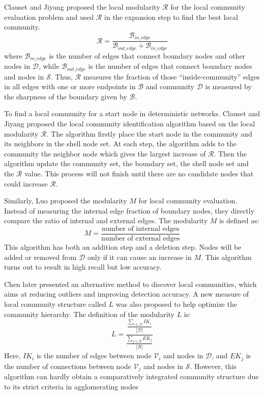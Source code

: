 \documentclass[\main/thesis.tex]{subfiles}
\begin{document}
Clauset \cite{clauset2005finding} and Jiyang \cite{chen2009detecting} proposed the local modularity $\mathcal{R}$ for the local community evaluation problem and used $\mathcal{R}$ in the expansion step to find the best local community.
\begin{equation}
\mathcal{R} = \frac{\mathcal{B}_{in\_edge}}{\mathcal{B}_{out\_edge}+\mathcal{B}_{in\_edge}}
\end{equation}
where $\mathcal{B}_{in\_edge}$ is the number of edges that connect boundary nodes and other nodes in $\mathcal{D}$, while $\mathcal{B}_{out\_edge}$ is the number of edges that connect boundary nodes and nodes in $\mathcal{S}$. Thus, $\mathcal{R}$ measures the fraction of those “inside-community” edges in all edges with one or more endpoints in $\mathcal{B}$ and community $\mathcal{D}$ is measured by the sharpness of the boundary given by $\mathcal{B}$.

To find a local community for a start node in deterministic networks. Clauset \cite{clauset2005finding} and Jiyang \cite{chen2009detecting} proposed the local community identification algorithm based on the local modularity $\mathcal{R}$. The algorithm firstly place the start node in the community and its neighbors in the shell node set. At each step, the algorithm adds to the community the neighbor node which gives the largest increase of $\mathcal{R}$. Then the algorithm update the community set, the boundary set, the shell node set and the $\mathcal{R}$ value. This process will not finish until there are no candidate nodes that could increase $\mathcal{R}$.

Similarly, Luo \cite{luo2008exploring} proposed the modularity $M$ for local community evaluation. Instead of measuring the internal edge fraction of boundary nodes, they directly compare the ratio of internal and external edges. The modularity $M$ is defined as:
\begin{equation}
M = \frac{\text{number of internal edges}}{\text{number of external edges}}
\end{equation}
This algorithm has both an addition step and a deletion step. Nodes will be added or removed from $\mathcal{D}$ only if it can cause an increase in $M$. This algorithm turns out to result in high recall but low accuracy.

Chen \cite{chen2009local} later presented an alternative method to discover local communities, which aims at reducing outliers and improving detection accuracy. A new measure of local community structure called $L$ was also proposed to help optimize the community hierarchy. The definition of the modularity $L$ is:
\begin{equation}
L=\frac{\frac{\sum_{i\in \mathcal{D}}IK_i}{|\mathcal{D}|}}{\frac{\sum_{j\in \mathcal{B}}EK_j}{|\mathcal{B}|}}
\end{equation}
Here, $IK_i$ is the number of edges between node $\mathcal{V}_i$ and nodes in $\mathcal{D}$, and $EK_j$ is the number of connections between node $\mathcal{V}_j$ and nodes in $\mathcal{S}$. However, this algorithm can hardly obtain a comparatively integrated community structure due to its strict criteria in agglomerating nodes
\end{document}
